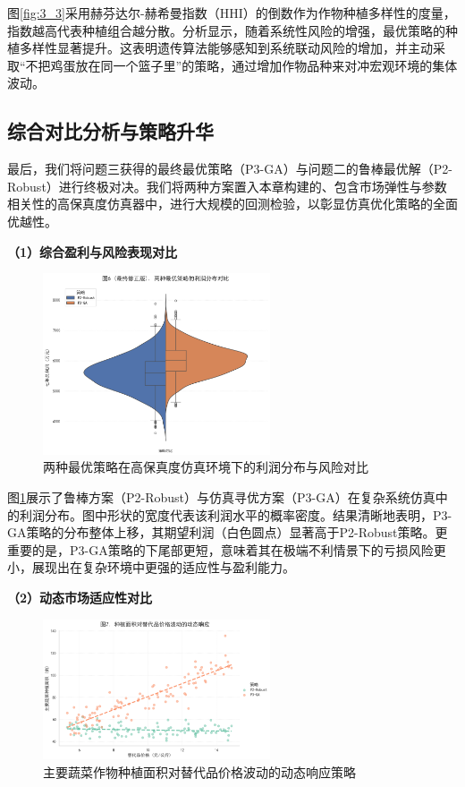 \documentclass[withoutpreface,bwprint]{cumcmthesis} %
\begin{document}
图\ref{fig:3_3}采用赫芬达尔-赫希曼指数（HHI）的倒数作为作物种植多样性的度量，指数越高代表种植组合越分散。分析显示，随着系统性风险的增强，最优策略的种植多样性显著提升。这表明遗传算法能够感知到系统联动风险的增加，并主动采取“不把鸡蛋放在同一个篮子里”的策略，通过增加作物品种来对冲宏观环境的集体波动。

\subsection{综合对比分析与策略升华}

最后，我们将问题三获得的最终最优策略（P3-GA）与问题二的鲁棒最优解（P2-Robust）进行终极对决。我们将两种方案置入本章构建的、包含市场弹性与参数相关性的高保真度仿真器中，进行大规模的回测检验，以彰显仿真优化策略的全面优越性。

\textbf{（1）综合盈利与风险表现对比}

\begin{figure}[htbp]
    \centering
    \includegraphics[width=0.6\textwidth]{figures/3_4.png}
    \caption{两种最优策略在高保真度仿真环境下的利润分布与风险对比}
    \label{fig:3_4}
\end{figure}

图\ref{fig:3_4}展示了鲁棒方案（P2-Robust）与仿真寻优方案（P3-GA）在复杂系统仿真中的利润分布。图中形状的宽度代表该利润水平的概率密度。结果清晰地表明，P3-GA策略的分布整体上移，其期望利润（白色圆点）显著高于P2-Robust策略。更重要的是，P3-GA策略的下尾部更短，意味着其在极端不利情景下的亏损风险更小，展现出在复杂环境中更强的适应性与盈利能力。

\textbf{（2）动态市场适应性对比}

\begin{figure}[htbp]
    \centering
    \includegraphics[width=0.6\textwidth]{figures/3_5.png}
    \caption{主要蔬菜作物种植面积对替代品价格波动的动态响应策略}
    \label{fig:3_5}
\end{figure}
\end{document}
